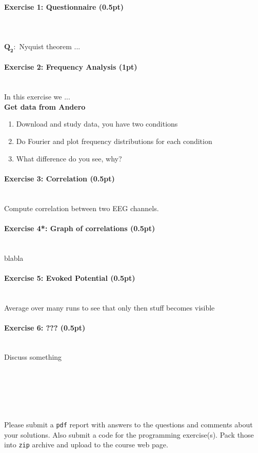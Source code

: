 \documentclass[a4paper,11pt]{article}
\newenvironment{exercise}[3]{\paragraph{Exercise #1: #2 (#3pt)}\ \\}{
\medskip}
\newcommand{\question}[2]{\setlength\parindent{0mm}\ \\$\mathbf{Q_#1:}$ #2\ \\}
\begin{document}
\begin{exercise}{1}{Questionnaire}{0.5}
\question{2}{Nyquist theorem ...}
\end{exercise}

\begin{exercise}{2}{Frequency Analysis}{1}
In this exercise we ... \\
\textbf{Get data from Andero}
\begin{enumerate}
\itemsep 0em
	\item Download and study data, you have two conditions
	\item Do Fourier and plot frequency distributions for each condition
	\item What difference do you see, why?
\end{enumerate}
\end{exercise}

\begin{exercise}{3}{Correlation}{0.5}
Compute correlation between two EEG channels.
\end{exercise}

\begin{exercise}{4*}{Graph of correlations}{0.5}
blabla
\end{exercise}


\begin{exercise}{5}{Evoked Potential}{0.5}
Average over many runs to see that only then stuff becomes visible
\end{exercise}


\begin{exercise}{6}{???}{0.5}
Discuss something
\end{exercise}
\ \\
\ \\
\ \\
\ \\
\ \\
Please submit a \texttt{pdf} report with answers to the questions and comments about your solutions. Also submit a code for the programming exercise(s). Pack those into \texttt{zip} archive and upload to the course web page.
\end{document}
